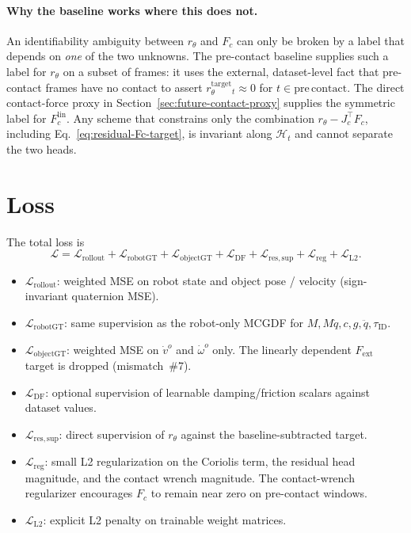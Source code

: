\documentclass[11pt]{article}
\begin{document}
\paragraph{Why the baseline works where this does not.}
An identifiability ambiguity between $r_\theta$ and $F_c$ can only be
broken by a label that depends on \emph{one} of the two unknowns. The
pre-contact baseline supplies such a label for $r_\theta$ on a subset of
frames: it uses the external, dataset-level fact that pre-contact frames
have no contact to assert
$r_\theta^{\mathrm{target}}_t \approx 0$ for $t \in \mathrm{pre\,contact}$.
The direct contact-force proxy in
Section~\ref{sec:future-contact-proxy} supplies the symmetric label for
$F_c^{\mathrm{lin}}$. Any scheme that constrains only the combination
$r_\theta - J_c^\top F_c$, including
Eq.~\eqref{eq:residual-Fc-target}, is invariant along $\mathcal{H}_t$ and
cannot separate the two heads.

\section{Loss}

The total loss is
\begin{equation}
  \mathcal{L} =
  \mathcal{L}_{\mathrm{rollout}}
  + \mathcal{L}_{\mathrm{robotGT}}
  + \mathcal{L}_{\mathrm{objectGT}}
  + \mathcal{L}_{\mathrm{DF}}
  + \mathcal{L}_{\mathrm{res,sup}}
  + \mathcal{L}_{\mathrm{reg}}
  + \mathcal{L}_{\mathrm{L2}}.
\end{equation}
\begin{itemize}
  \item $\mathcal{L}_{\mathrm{rollout}}$: weighted MSE on robot state and
    object pose / velocity (sign-invariant quaternion MSE).
  \item $\mathcal{L}_{\mathrm{robotGT}}$: same supervision as the robot-only
    MCGDF for $M, M\ddot q, c, g, \ddot q, \tau_{\mathrm{ID}}$.
  \item $\mathcal{L}_{\mathrm{objectGT}}$: weighted MSE on $\dot v^o$ and
    $\dot\omega^o$ only.  The linearly dependent $F_{\mathrm{ext}}$ target
    is dropped (mismatch~\#7).
  \item $\mathcal{L}_{\mathrm{DF}}$: optional supervision of learnable
    damping/friction scalars against dataset values.
  \item $\mathcal{L}_{\mathrm{res,sup}}$: direct supervision of $r_\theta$
    against the baseline-subtracted target.
  \item $\mathcal{L}_{\mathrm{reg}}$: small L2 regularization on the
    Coriolis term, the residual head magnitude, and the contact wrench
    magnitude.  The contact-wrench regularizer encourages $F_c$ to remain
    near zero on pre-contact windows.
  \item $\mathcal{L}_{\mathrm{L2}}$: explicit L2 penalty on trainable weight
    matrices.
\end{itemize}
\end{document}

